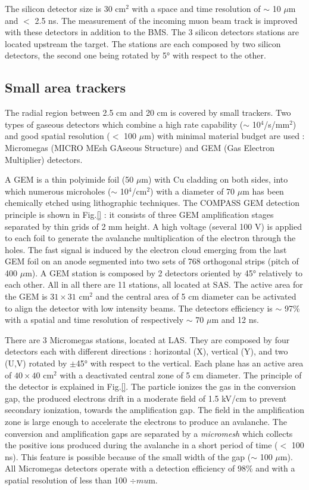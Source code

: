The silicon detector size is 30 cm$^2$ with a space and time resolution of $\sim$ 10 $\mu$m and $<$ 2.5 ns. The measurement
of the incoming muon beam track is improved with these detectors in addition to the BMS. The 3 silicon detectors stations are
located upstream the target. The stations are each composed by two silicon detectors, the second one being rotated by 5° with
respect to the other.

\subsection*{Small area trackers}

The radial region between 2.5 cm and 20 cm is covered by small trackers. Two types of gaseous detectors which combine
a high rate capability ($\sim$ 10$^4$/s/mm$^2$) and good spatial resolution ($<$ 100 $\mu$m) with minimal material budget are used :
Micromegas (MICRO MEsh GAseous Structure) and GEM (Gas Electron Multiplier) detectors.

A GEM is a thin polyimide foil (50 $\mu$m) with Cu cladding on both sides, into which numerous microholes ($\sim$ 10$^4$/cm$^2$)
with a diameter of 70 $\mu$m has been chemically etched using lithographic techniques. The COMPASS GEM detection principle is shown
in Fig.\ref{} : it consists of three GEM amplification stages separated by thin grids of 2 mm height. A high voltage (several 100 V)
is applied to each foil to generate the avalanche multiplication of the electron through the holes. The fast signal is induced by
the electron cloud emerging from the last GEM foil on an anode segmented into two sets of 768 orthogonal strips (pitch of 400 $\mu$m).
A GEM station is composed by 2 detectors oriented by 45° relatively to each other. All in all there are 11 stations, all located at SAS.
The active area for the GEM is $31 \times 31$ cm$^2$ and the central area of 5 cm diameter can be activated to align the detector
with low intensity beams. The detectors efficiency is $\sim$ 97\% with a spatial and time resolution of respectively $\sim$ 70 $\mu$m
and 12 ns.

There are 3 Micromegas stations, located at LAS. They are composed by four detectors each with different directions : horizontal (X),
vertical (Y), and two (U,V) rotated by $\pm$45° with respect to the vertical. Each plane has an active area of $40 \times 40$ cm$^2$
with a deactivated central zone of 5 cm diameter. The principle of the detector is explained in Fig.\ref{}. The particle ionizes the
gas in the conversion gap, the produced electrons drift in a moderate field of 1.5 kV/cm to prevent secondary ionization, towards
the amplification gap. The field in the amplification zone is large enough to accelerate the electrons to produce an avalanche.
The conversion and amplification gaps are separated by a \textit{micromesh} which collects the positive ions produced during the
avalanche in a short period of time ($<$ 100 ns). This feature is possible because of the small width of the gap ($\sim$ 100 $\mu$m).
All Micromegas detectors operate with a detection efficiency of 98\% and with a spatial resolution of less than 100 $÷mu$m.


